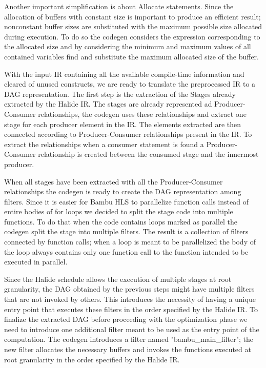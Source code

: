 \documentclass[../main.tex]{subfiles}
\begin{document}
Another important simplification is about Allocate statements.
Since the allocation of buffers with constant size is important to produce an efficient result; nonconstant buffer sizes are substituted with the maximum possible size allocated during execution.
To do so the codegen considers the expression corresponding to the allocated size and by considering the minimum and maximum values of all contained variables find and substitute the maximum allocated size of the buffer.


With the input IR containing all the available compile-time information and cleared of unused constructs, we are ready to translate the preprocessed IR to a DAG representation.
The first step is the extraction of the Stages already extracted by the Halide IR.
The stages are already represented ad Producer-Consumer relationships, the codegen uses these relationships and extract one stage for each producer element in the IR.
The elements extracted are then connected according to Producer-Consumer relationships present in the IR.
To extract the relationships when a consumer statement is found a Producer-Consumer relationship is created between the consumed stage and the innermost producer.

When all stages have been extracted with all the Producer-Consumer relationships the codegen is ready to create the DAG representation among filters.
Since it is easier for Bambu HLS to parallelize function calls instead of entire bodies of for loops we decided to split the stage code into multiple functions.
To do that when the code contains loops marked as parallel the codegen split the stage into multiple filters.
The result is a collection of filters connected by function calls; when a loop is meant to be parallelized the body of the loop always contains only one function call to the function intended to be executed in parallel.

Since the Halide schedule allows the execution of multiple stages at root granularity, the DAG obtained by the previous steps might have multiple filters that are not invoked by others.
This introduces the necessity of having a unique entry point that executes these filters in the order specified by the Halide IR.
To finalize the extracted DAG before proceeding with the optimization phase we need to introduce one additional filter meant to be used as the entry point of the computation.
The codegen introduces a filter named "bambu\_main\_filter"; the new filter allocates the necessary buffers and invokes the functions executed at root granularity in the order specified by the Halide IR.
\end{document}
